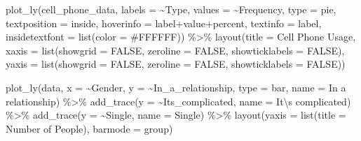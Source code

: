 \documentclass[
]{book}
\newenvironment{Shaded}{\begin{snugshade}}{\end{snugshade}}
\newcommand{\AttributeTok}[1]{\textcolor[rgb]{0.77,0.63,0.00}{#1}}
\newcommand{\ConstantTok}[1]{\textcolor[rgb]{0.00,0.00,0.00}{#1}}
\newcommand{\FunctionTok}[1]{\textcolor[rgb]{0.00,0.00,0.00}{#1}}
\newcommand{\NormalTok}[1]{#1}
\newcommand{\SpecialCharTok}[1]{\textcolor[rgb]{0.00,0.00,0.00}{#1}}
\newcommand{\StringTok}[1]{\textcolor[rgb]{0.31,0.60,0.02}{#1}}
\begin{document}
\begin{Shaded}
\begin{Highlighting}[]
\FunctionTok{plot\_ly}\NormalTok{(cell\_phone\_data, }\AttributeTok{labels =} \SpecialCharTok{\textasciitilde{}}\NormalTok{Type, }\AttributeTok{values =} \SpecialCharTok{\textasciitilde{}}\NormalTok{Frequency, }\AttributeTok{type =} \StringTok{\textquotesingle{}pie\textquotesingle{}}\NormalTok{,}
        \AttributeTok{textposition =} \StringTok{\textquotesingle{}inside\textquotesingle{}}\NormalTok{, }\AttributeTok{hoverinfo =} \StringTok{\textquotesingle{}label+value+percent\textquotesingle{}}\NormalTok{,}
        \AttributeTok{textinfo =} \StringTok{\textquotesingle{}label\textquotesingle{}}\NormalTok{, }\AttributeTok{insidetextfont =} \FunctionTok{list}\NormalTok{(}\AttributeTok{color =} \StringTok{\textquotesingle{}\#FFFFFF\textquotesingle{}}\NormalTok{)) }\SpecialCharTok{\%\textgreater{}\%}
  \FunctionTok{layout}\NormalTok{(}\AttributeTok{title =} \StringTok{\textquotesingle{}Cell Phone Usage\textquotesingle{}}\NormalTok{,}
         \AttributeTok{xaxis =} \FunctionTok{list}\NormalTok{(}\AttributeTok{showgrid =} \ConstantTok{FALSE}\NormalTok{, }\AttributeTok{zeroline =} \ConstantTok{FALSE}\NormalTok{, }\AttributeTok{showticklabels =} \ConstantTok{FALSE}\NormalTok{),}
         \AttributeTok{yaxis =} \FunctionTok{list}\NormalTok{(}\AttributeTok{showgrid =} \ConstantTok{FALSE}\NormalTok{, }\AttributeTok{zeroline =} \ConstantTok{FALSE}\NormalTok{, }\AttributeTok{showticklabels =} \ConstantTok{FALSE}\NormalTok{))}
\end{Highlighting}
\end{Shaded}

\begin{Shaded}
\begin{Highlighting}[]
\FunctionTok{plot\_ly}\NormalTok{(data, }\AttributeTok{x =} \SpecialCharTok{\textasciitilde{}}\NormalTok{Gender, }\AttributeTok{y =} \SpecialCharTok{\textasciitilde{}}\NormalTok{In\_a\_relationship, }\AttributeTok{type =} \StringTok{\textquotesingle{}bar\textquotesingle{}}\NormalTok{, }\AttributeTok{name =} \StringTok{\textquotesingle{}In a relationship\textquotesingle{}}\NormalTok{) }\SpecialCharTok{\%\textgreater{}\%}
  \FunctionTok{add\_trace}\NormalTok{(}\AttributeTok{y =} \SpecialCharTok{\textasciitilde{}}\NormalTok{Its\_complicated, }\AttributeTok{name =} \StringTok{\textquotesingle{}It}\SpecialCharTok{\textbackslash{}\textquotesingle{}}\StringTok{s complicated\textquotesingle{}}\NormalTok{) }\SpecialCharTok{\%\textgreater{}\%}
  \FunctionTok{add\_trace}\NormalTok{(}\AttributeTok{y =} \SpecialCharTok{\textasciitilde{}}\NormalTok{Single, }\AttributeTok{name =} \StringTok{\textquotesingle{}Single\textquotesingle{}}\NormalTok{) }\SpecialCharTok{\%\textgreater{}\%}
  \FunctionTok{layout}\NormalTok{(}\AttributeTok{yaxis =} \FunctionTok{list}\NormalTok{(}\AttributeTok{title =} \StringTok{\textquotesingle{}Number of People\textquotesingle{}}\NormalTok{), }\AttributeTok{barmode =} \StringTok{\textquotesingle{}group\textquotesingle{}}\NormalTok{)}
\end{Highlighting}
\end{Shaded}


  
\end{document}
